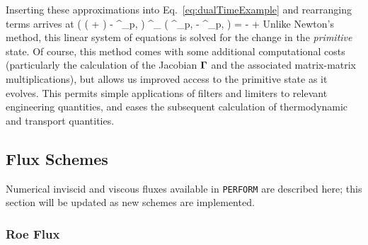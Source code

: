 Inserting these approximations into Eq.~\ref{eq:dualTimeExample} and rearranging terms arrives at
\be
    \left( \left(  +  \right) \identMat -  \jacobMat^\timeIdx_{p,} \right) \gm^\timeIdx_{} \left( \consVec^\timeIdx_{p,\newtonIdx} - \consVec^\timeIdx_{p,} \right) = -   + 
\ee
Unlike Newton's method, this linear system of equations is solved for the change in the \textit{primitive} state. Of course, this method comes with some additional computational costs (particularly the calculation of the Jacobian $\boldsymbol{\Gamma}$ and the associated matrix-matrix multiplications), but allows us improved access to the primitive state as it evolves. This permits simple applications of filters and limiters to relevant engineering quantities, and eases the subsequent calculation of thermodynamic and transport quantities.

\newpage
\subsection{Flux Schemes}\label{sec:fluxSchemes}

Numerical inviscid and viscous fluxes available in \verb|PERFORM| are described here; this section will be updated as new schemes are implemented.

\subsubsection{Roe Flux}

